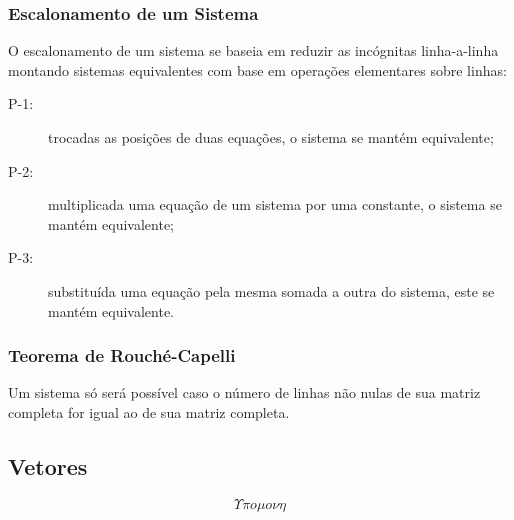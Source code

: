     \subsubsection{Escalonamento de um Sistema}
        O escalonamento de um sistema se baseia em reduzir as incógnitas linha-a-linha montando sistemas equivalentes com base em operações elementares sobre linhas:
        \begin{description}
            \item[P-1:] trocadas as posições de duas equações, o sistema se mantém equivalente;
            \item[P-2:] multiplicada uma equação de um sistema por uma constante, o sistema se mantém equivalente;
            \item[P-3:] substituída uma equação pela mesma somada a outra do sistema, este se mantém equivalente.
        \end{description}
    \subsubsection{Teorema de Rouché-Capelli}
        Um sistema só será possível caso o número de linhas não nulas de sua matriz completa for igual ao de sua matriz completa.
\subsection{Vetores}
    \[ \Upsilon \pi o \mu o \nu \eta \]